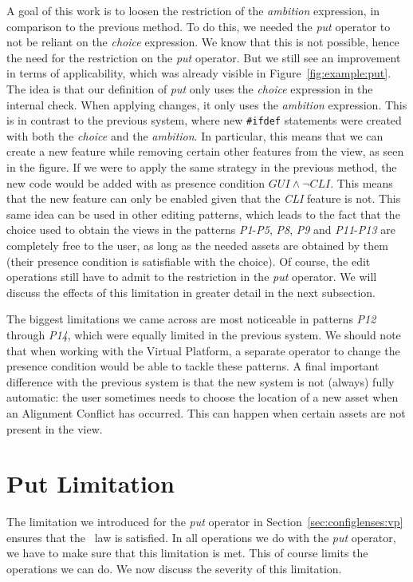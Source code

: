 A goal of this work is to loosen the restriction of the \emph{ambition} expression,
in comparison to the previous method. To do this, we needed the \emph{put} operator
to not be reliant on the \emph{choice} expression. We know that this is not possible,
hence the need for the restriction on the \emph{put} operator. But we still see an
improvement in terms of applicability, which was already visible in Figure~\ref{fig:example:put}.
The idea is that our definition of \emph{put} only uses the \emph{choice} expression
in the internal check. When applying changes, it only uses the \emph{ambition} expression.
This is in contrast to the previous system, where new \texttt{\#ifdef} statements were
created with both the \emph{choice} and the \emph{ambition}. In particular, this means
that we can create a new feature while removing certain other features from the view,
as seen in the figure. If we were to apply the same strategy in the previous method, the
new code would be added with as presence condition \(\mathit{GUI} \land \neg\mathit{CLI}\).
This means that the new feature can only be enabled given that the \emph{CLI} feature is not.
This same idea can be used in other editing patterns, which leads to the fact that the 
choice used to obtain the views in the patterns \emph{P1}-\emph{P5}, \emph{P8}, \emph{P9}
and \emph{P11}-\emph{P13} are completely free to the user, as long as the needed assets
are obtained by them (their presence condition is satisfiable with the choice).
Of course, the edit operations still have to admit to the restriction in the 
\emph{put} operator. We will discuss the effects of this limitation in greater detail in 
the next subsection. 

The biggest limitations we came across are most noticeable in patterns
\emph{P12} through \emph{P14}, which were equally limited in the previous system.
We should note that when working with the Virtual Platform, a separate operator 
to change the presence condition would be able to tackle these patterns. A final
important difference with the previous system is that the new system is not (always)
fully automatic: the user sometimes needs to choose the location of a new asset 
when an Alignment Conflict has occurred. This can happen when certain assets are 
not present in the view.

\section{Put Limitation}
The limitation we introduced for the \emph{put} operator in
Section~\ref{sec:configlenses:vp} ensures that the \putget~law is satisfied.
In all operations we do with the \emph{put} operator, we have to make sure that
this limitation is met. This of course limits the operations we can do. We now
discuss the severity of this limitation.

